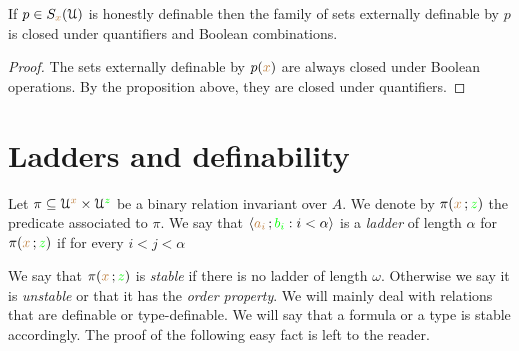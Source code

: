 \begin{corollary}
If $p\in S_{{\color{brown} x}}(\EuScript U)$ is honestly definable then the family of sets externally definable by $p$ is closed under quantifiers and Boolean combinations.
\end{corollary}

\begin{proof}
The sets externally definable by $p({\color{brown} x})$ are always closed under Boolean operations.
By the proposition above, they are closed under quantifiers.
\end{proof}


\section{Ladders and definability}


Let $\pi\subseteq\EuScript U^{\color{brown} x}\times\EuScript U^{\color{green} z}$ be a binary relation invariant over $A$.
We denote by $\pi({\color{brown} x}\,;{\color{green} z})$ the predicate associated to $\pi$.
We say that $\langle{\color{brown}a_i}\,;{\color{green} b_i} : i<\alpha\rangle$ is a \emph{ladder\/} of length $\alpha$ for $\pi({\color{brown} x}\,;{\color{green} z})$ if for every $i<j<\alpha$


We say that $\pi({\color{brown} x}\,;{\color{green} z})$ is \emph{stable\/} if there is no ladder of length $\omega$.
Otherwise we say it is \emph{unstable} or that it has the \emph{order property}.
We will mainly deal with relations that are definable or type-definable.
We will say that a formula or a type is stable accordingly.
The proof of the following easy fact is left to the reader.

